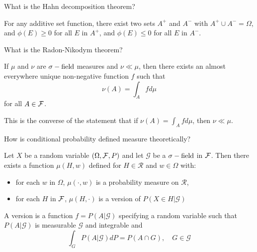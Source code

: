 \documentclass[avery5388,grid,frame]{flashcards}
\begin{document}
\begin{flashcard}
    {What is the Hahn decomposition theorem?}
    \begin{theorem}
        For any additive set function, there exist two sets $A^+$ and $A^-$ with $A^+ \cup A^- = \Omega$, and $\phi(E) \geq 0$ for all $E$ in $A^+$, and $\phi(E) \leq 0$ for all $E$ in $A^-$.
    \end{theorem}
\end{flashcard}


\begin{flashcard}
    {What is the Radon-Nikodym theorem?}
    \begin{theorem}
        If $\mu$ and $\nu$ are $\sigma-\text{field}$ measures and $\nu \ll \mu$, then there exists an almost everywhere unique non-negative function $f$ such that
        $$\nu(A) = \int_A f d\mu$$
        for all $A \in \mathcal F$.
    \end{theorem}

    \begin{remark}
        This is the converse of the statement that if $\nu(A) = \int_A f d\mu$, then $\nu \ll \mu$.
    \end{remark}
\end{flashcard}


\begin{flashcard}
    {How is conditional probability defined measure theoretically?}
    \begin{theorem}
        Let $X$ be a random variable $(\Omega, \mathcal F, P)$ and let $\mathcal G$ be a $\sigma-\text{field}$ in $\mathcal F$. Then there exists a function $\mu(H,w)$ defined for $H \in \mathcal R$ and $w \in \Omega$ with:
        \begin{itemize}
            \item for each $w$ in $\Omega$, $\mu(\cdot,w)$ is a probability measure on $\mathcal R$,
            \item for each $H$ in $\mathcal F$, $\mu(H,\cdot)$ is a version of $P(X \in H | \mathcal G)$
        \end{itemize}
    \end{theorem}

    \begin{definition}
        A version is a function $f = P(A | \mathcal G)$ specifying a random variable such that $P(A | \mathcal G)$ is measurable $\mathcal G$ and integrable and
        $$\int_G P(A | \mathcal G) dP = P(A \cap G), \quad G \in \mathcal G$$
    \end{definition}
\end{flashcard}
\end{document}
